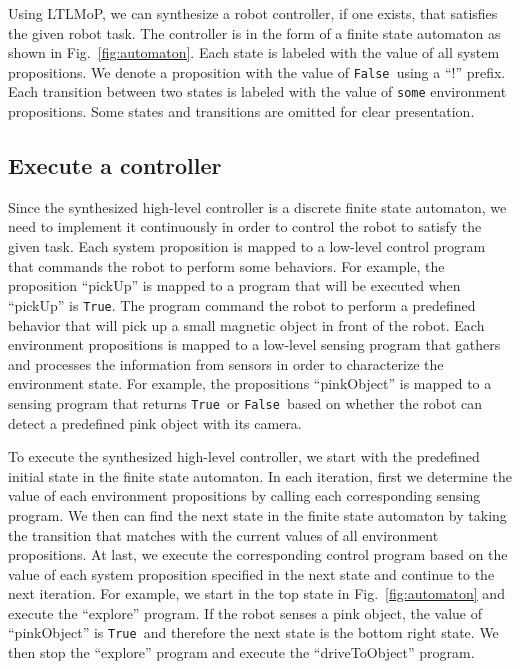 \documentclass[conference]{IEEEtran}
\newcommand{\lt}{{\tt True }}
\newcommand{\lf}{{\tt False }}
\newcommand{\ltnsp}{{\tt True}}
\begin{document}
Using LTLMoP, we can synthesize a robot controller, if one exists, that satisfies the given robot task. The controller is in the form of a finite state automaton as shown in Fig.~\ref{fig:automaton}. Each state is labeled with the value of all system propositions. We denote a proposition with the value of \lf using a ``!'' prefix. Each transition between two states is labeled with the value of {\tt some} environment propositions. Some states and transitions are omitted for clear presentation.

\subsection{Execute a controller}
Since the synthesized high-level controller is a discrete finite state automaton, we need to implement it continuously in order to control the robot to satisfy the given task. 
Each system proposition is mapped to a low-level control program that commands the robot to perform some behaviors.
For example, the proposition ``pickUp'' is mapped to a program that will be executed when ``pickUp'' is \ltnsp. The program command the robot to perform a predefined behavior that will pick up a small magnetic object in front of the robot.
Each environment propositions is mapped to a low-level sensing program that gathers and processes the information from sensors in order to characterize the environment state.
For example, the propositions ``pinkObject'' is mapped to a sensing program that returns \lt or \lf based on whether the robot can detect a predefined pink object with its camera.

To execute the synthesized high-level controller, we start with the predefined initial state in the finite state automaton.
In each iteration, first we determine the value of each environment propositions by calling each corresponding sensing program.
We then can find the next state in the finite state automaton by taking the transition that matches with the current values of all environment propositions.
At last, we execute the corresponding control program based on the value of each system proposition specified in the next state and continue to the next iteration.
For example, we start in the top state in Fig.~\ref{fig:automaton} and execute the ``explore'' program.
If the robot senses a pink object, the value of ``pinkObject'' is \lt and therefore the next state is the bottom right state. We then stop the ``explore'' program and execute the ``driveToObject'' program.

\end{document}
